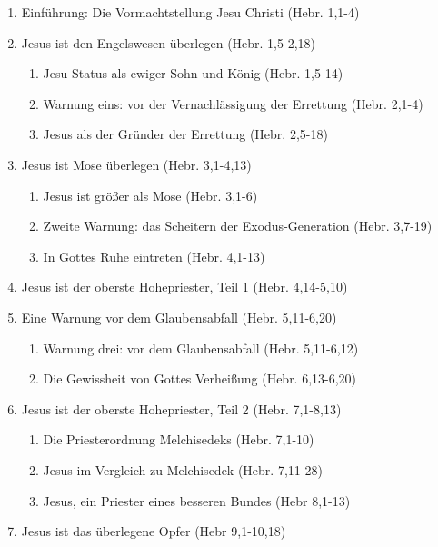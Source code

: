 \documentclass[
  12pt,
]{krantz}
\providecommand{\tightlist}{%
  \setlength{\itemsep}{0pt}\setlength{\parskip}{0pt}}
\begin{document}
\begin{enumerate}
\def\labelenumi{\arabic{enumi}.}
\tightlist
\item
  Einführung: Die Vormachtstellung Jesu Christi (Hebr. 1,1-4)
\item
  Jesus ist den Engelswesen überlegen (Hebr. 1,5-2,18)

  \begin{enumerate}
  \def\labelenumii{\roman{enumii}.}
  \tightlist
  \item
    Jesu Status als ewiger Sohn und König (Hebr. 1,5-14)
  \item
    Warnung eins: vor der Vernachlässigung der Errettung (Hebr. 2,1-4)
  \item
    Jesus als der Gründer der Errettung (Hebr. 2,5-18)
  \end{enumerate}
\item
  Jesus ist Mose überlegen (Hebr. 3,1-4,13)

  \begin{enumerate}
  \def\labelenumii{\roman{enumii}.}
  \tightlist
  \item
    Jesus ist größer als Mose (Hebr. 3,1-6)
  \item
    Zweite Warnung: das Scheitern der Exodus-Generation (Hebr. 3,7-19)
  \item
    In Gottes Ruhe eintreten (Hebr. 4,1-13)
  \end{enumerate}
\item
  Jesus ist der oberste Hohepriester, Teil 1 (Hebr. 4,14-5,10)
\item
  Eine Warnung vor dem Glaubensabfall (Hebr. 5,11-6,20)

  \begin{enumerate}
  \def\labelenumii{\roman{enumii}.}
  \tightlist
  \item
    Warnung drei: vor dem Glaubensabfall (Hebr. 5,11-6,12)
  \item
    Die Gewissheit von Gottes Verheißung (Hebr. 6,13-6,20)
  \end{enumerate}
\item
  Jesus ist der oberste Hohepriester, Teil 2 (Hebr. 7,1-8,13)

  \begin{enumerate}
  \def\labelenumii{\roman{enumii}.}
  \tightlist
  \item
    Die Priesterordnung Melchisedeks (Hebr. 7,1-10)
  \item
    Jesus im Vergleich zu Melchisedek (Hebr. 7,11-28)
  \item
    Jesus, ein Priester eines besseren Bundes (Hebr 8,1-13)
  \end{enumerate}
\item
  Jesus ist das überlegene Opfer (Hebr 9,1-10,18)


\end{enumerate}
\end{document}
